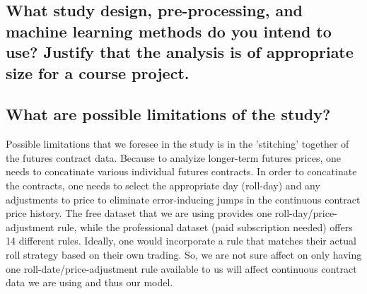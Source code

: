 \documentclass[twoside,11pt]{article}
\begin{document}
\subsection{What study design, pre-processing, and machine learning methods do you intend to use? Justify that the analysis is of appropriate size for a course project.}



\subsection{What are possible limitations of the study?}

Possible limitations that we foresee in the study is in the 'stitching' together of the futures contract data.  Because to analyize longer-term futures prices, one needs to concatinate various individual futures contracts.  In order to concatinate the contracts, one needs to select the appropriate day (roll-day) and any adjustments to price to eliminate error-inducing jumps in the continuous contract price history.  The free dataset that we are using provides one roll-day/price-adjustment rule, while the professional dataset (paid subscription needed) offers 14 different rules.  Ideally, one would incorporate a rule that matches their actual roll strategy based on their own trading.  So, we are not sure affect on only having one roll-date/price-adjustment rule available to us will affect continuous contract data we are using and thus our model.  





\end{document}
